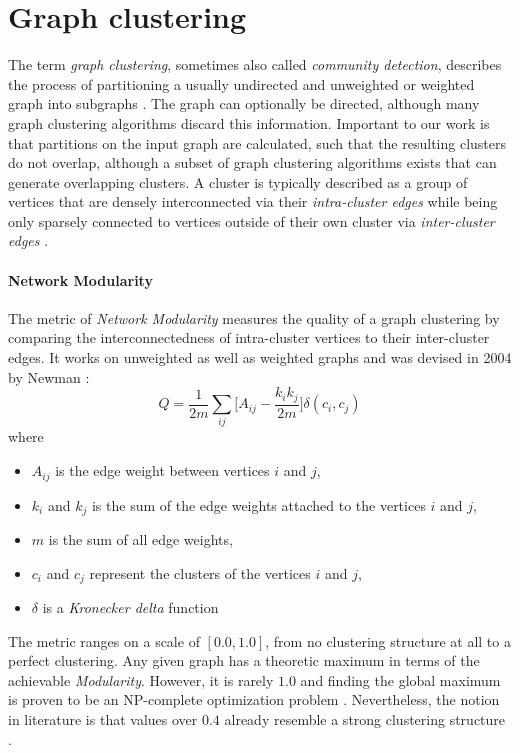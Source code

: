 \documentclass[12pt,a4paper]{report}
\begin{document}
\section{Graph clustering} \label{sect:background-graph-clustering}

The term \textit{graph clustering}, sometimes also called \textit{community
detection}, describes the process of partitioning a usually undirected and
unweighted or weighted graph into subgraphs \cite{lancichinetti2009community}.
The graph can optionally be directed, although many graph clustering algorithms
discard this information. Important to our work is that partitions on the input
graph are calculated, such that the resulting clusters do not overlap, although
a subset of graph clustering algorithms exists that can generate overlapping
clusters. A cluster is typically described as a group of vertices that are
densely interconnected via their \textit{intra-cluster edges} while being only
sparsely connected to vertices outside of their own cluster via
\textit{inter-cluster edges} \cite{lancichinetti2009community, newman2004fast}.

\paragraph{Network Modularity}
The metric of \textit{Network Modularity} measures the quality
of a graph clustering by comparing the interconnectedness of intra-cluster
vertices to their inter-cluster edges. It works on unweighted as well as
weighted graphs \cite{clauset2004modularity, blondel2008modularity} and was
devised in 2004 by Newman \cite{newman2004fast}:
\[
  Q =
  \frac{1}{2m}
  \sum \limits _{ij}{\bigg[ A_{ij} - \frac{k_i k_j}{2m} \bigg]}
  \delta (c_i, c_j)
\]
where
\begin{itemize}[noitemsep]
  \item \(A_{ij}\) is the edge weight between vertices \(i\) and \(j\),
  \item \(k_i\) and \(k_j\) is the sum of the edge weights attached to the vertices \(i\) and \(j\),
  \item \(m\) is the sum of all edge weights,
  \item \(c_i\) and \(c_j\) represent the clusters of the vertices \(i\) and \(j\),
  \item \(\delta\) is a \textit{Kronecker delta} function
\end{itemize}
The metric ranges on a scale of \([0.0, 1.0]\), from no clustering structure at
all to a perfect clustering. Any given graph has a theoretic maximum in terms
of the achievable \textit{Modularity}. However, it is rarely \(1.0\) and
finding the global maximum is proven to be an NP-complete optimization problem
\cite{brandes2006maximizing}. Nevertheless, the notion in literature is that
values over \(0.4\) already resemble a strong clustering structure
\cite{newman2004fast, fortunato2007resolution}.
\end{document}
